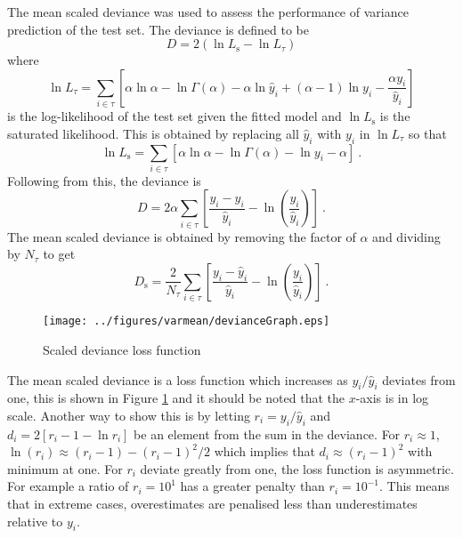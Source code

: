 The mean scaled deviance was used to assess the performance of variance prediction of the test set. The deviance is defined to be
\begin{equation}
  D = 2\left(
    \ln L_\mathrm{s} - \ln L_\tau
  \right)
\end{equation}
where
\begin{equation}
\ln L_\tau = \sum_{i\in\tau} \left[
    \alpha\ln\alpha
    -\ln\Gamma(\alpha)
    -\alpha\ln \widehat{y}_i
    +(\alpha-1)\ln y_i
    -\frac{\alpha y_i}{\widehat{y}_i}
  \right]
\end{equation}
is the log-likelihood of the test set given the fitted model and $\ln L_\mathrm{s}$ is the saturated likelihood. This is obtained by replacing all $\widehat{y}_i$ with $y_i$ in $\ln L_\tau$ so that
\begin{equation}
  \ln L_\mathrm{s} = \sum_{i\in\tau}\left[
    \alpha\ln\alpha
    -\ln\Gamma(\alpha)
    -\ln y_i
    -\alpha
  \right]
  \ .
\end{equation}
Following from this, the deviance is
\begin{equation}
  D = 2\alpha
  \sum_{i\in\tau}\left[
      \dfrac{
          y_i-\widehat{y}_i
      }
      {
          \widehat{y}_i
      }
      - \ln\left(\dfrac{y_i}{\widehat{y}_i}\right)
  \right]
  \ .
\end{equation}
The mean scaled deviance is obtained by removing the factor of $\alpha$ and dividing by $N_\tau$ to get
\begin{equation}
    D_\mathrm{s} = \dfrac{2}{N_\tau}
    \sum_{i\in\tau}\left[
        \dfrac{
            y_i-\widehat{y}_i
        }
        {
            \widehat{y}_i
        }
        - \ln\left(\dfrac{y_i}{\widehat{y}_i}\right)
    \right]
    \ .
\end{equation}

\begin{figure}
  \centering
  \texttt{[image: ../figures/varmean/devianceGraph.eps]}
  \caption{Scaled deviance loss function}
  \label{fig:meanVar_deviance}
\end{figure}

The mean scaled deviance is a loss function which increases as $y_i/\widehat{y}_i$ deviates from one, this is shown in Figure \ref{fig:meanVar_deviance} and it should be noted that the $x$-axis is in log scale. Another way to show this is by letting $r_i = y_i/\widehat{y}_i$ and $d_i = 2\left[r_i-1-\ln r_i\right]$ be an element from the sum in the deviance. For $r_i\approx 1$, $\ln(r_i)\approx(r_i-1)-(r_i-1)^2/2$ which implies that $d_i\approx (r_i-1)^2$ with minimum at one. For $r_i$ deviate greatly from one, the loss function is asymmetric. For example a ratio of $r_i=10^1$ has a greater penalty than $r_i=10^{-1}$. This means that in extreme cases, overestimates are penalised less than underestimates relative to $y_i$. 

